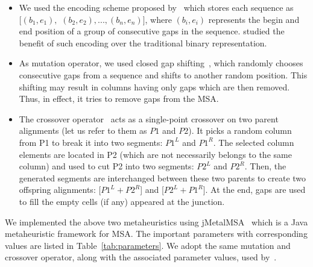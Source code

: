 \begin{itemize}
	\item We used the encoding scheme proposed by~\cite{rubio2016hybrid} which stores each sequence as $[(b_1, e_1),$ $(b_2, e_2), ..., (b_n, e_n)]$, where $(b_i, e_i)$ represents the begin and end position of a group of consecutive gaps in the sequence. \cite{zambrano2017m2align} studied the benefit of such encoding over the traditional binary representation.
	
	\item As mutation operator, we used closed gap shifting~\cite{ortuno2013optimizing}, which randomly chooses consecutive gaps from a sequence and shifts to another random position. This shifting may result in columns having only gaps which are then removed. Thus, in effect, it tries to remove gaps from the MSA. 
	
	\item The crossover operator~\citealp{da2010alineaga} acts as a single-point crossover on two parent alignments (let us refer to them as $ P1 $ and $ P2 $). It picks a random column from P1 to break it into two segments: $ P1^L $ and $ P1^R $. The selected column elements are located in P2 (which are not necessarily belongs to the same column) and used to cut P2 into two segments: $ P2^L $ and $ P2^R $. Then, the generated segments are interchanged between these two parents to create two offspring alignments: [$P1^L + P2^R$] and [$P2^L + P1^R$]. At the end, gaps are used to fill the empty cells (if any) appeared at the junction.
\end{itemize}

We implemented the above two metaheuristics using jMetalMSA~\citep{zambrano2017multi} which is a Java metaheuristic framework for MSA. The important parameters with corresponding values are listed in Table~\ref{tab:parameters}. We adopt the same mutation and crossover operator, along with the associated parameter values, used by~\cite{ortuno2013optimizing}.  

